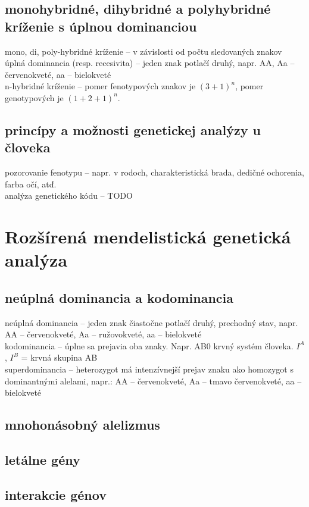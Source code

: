 \subsection{monohybridné, dihybridné a polyhybridné kríženie s úplnou dominanciou}
mono, di, poly-hybridné kríženie -- v závislosti od počtu sledovaných znakov\\
úplná dominancia (resp. recesivita) -- jeden znak potlačí druhý, napr. AA, Aa -- červenokveté, aa -- bielokveté\\

n-hybridné kríženie -- pomer fenotypových znakov je $(3 + 1)^n$, pomer genotypových je $(1 + 2 + 1)^n$. 
\subsection{princípy a možnosti genetickej analýzy u človeka}
pozorovanie fenotypu -- napr. v rodoch, charakteristická brada, dedičné ochorenia, farba očí, atď.\\
analýza genetického kódu -- TODO\\

\section{Rozšírená mendelistická genetická analýza}
\subsection{neúplná dominancia a kodominancia}
neúplná dominancia -- jeden znak čiastočne potlačí druhý, prechodný stav, napr. AA -- červenokveté, Aa -- ružovokveté, aa -- bielokveté\\
kodominancia -- úplne sa prejavia oba znaky. Napr. AB0 krvný systém človeka. $I^A$, $I^B$ = krvná skupina AB\\
superdominancia -- heterozygot má intenzívnejší prejav znaku ako homozygot s dominantnými alelami, napr.: AA -- červenokveté, Aa -- tmavo červenokveté, aa -- bielokveté\\
\subsection{mnohonásobný alelizmus}
\subsection{letálne gény}
\subsection{interakcie génov}
